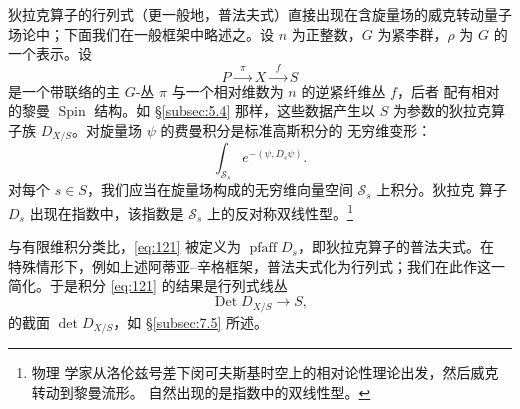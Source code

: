 \documentclass[11pt]{amsart}
\theoremstyle{definition}
\theoremstyle{remark}
\theoremstyle{plain}
\numberwithin{equation}{section}
\renewcommand{\:}{\colon}
\DeclareMathOperator{\Ker}{Ker}
\DeclareMathOperator{\Spin}{Spin}
\DeclareMathOperator{\Det}{Det}
\DeclareMathOperator{\pfaff}{pfaff}
\newcommand{\sS}{\mathscr{S}}
\begin{document}

狄拉克算子的行列式（更一般地，普法夫式）直接出现在含旋量场的威克转动量子
场论中；下面我们在一般框架中略述之。设 $n$ 为正整数，$G$ 为紧李群，$\rho $
为 $G$ 的一个表示。设
  \begin{equation}\label{eq:120}
     P\xrightarrow{\;\;\pi \;\;}X\xrightarrow{\;\;f\;\;}S 
  \end{equation}
是一个带联络的主 $G$-丛 $\pi $ 与一个相对维数为 $n$ 的逆紧纤维丛 $f$，后者
配有相对的黎曼 $\Spin$ 结构。如 §\ref{subsec:5.4} 那样，这些数据产生以 $S$
为参数的狄拉克算子族 $D_{X/S}$。对旋量场 $\psi $ 的费曼积分是标准高斯积分的
无穷维变形：
  \begin{equation}\label{eq:121}
     \int_{\sS_s} e^{-(\psi ,D_s\psi )}. 
  \end{equation}
对每个 $s\in S$，我们应当在旋量场构成的无穷维向量空间 $\sS_s$ 上积分。狄拉克
算子 $D_s$ 出现在指数中，该指数是 $\sS_s$ 上的反对称双线性型。\footnote{物理
学家从洛伦兹号差下闵可夫斯基时空上的相对论性理论出发，然后威克转动到黎曼流形。
自然出现的是指数中的双线性型。}



与有限维积分类比，\eqref{eq:121} 被定义为 $\pfaff D_s$，即狄拉克算子的普法夫式。在
特殊情形下，例如上述阿蒂亚–辛格框架，普法夫式化为行列式；我们在此作这一
简化。于是积分 \eqref{eq:121} 的结果是行列式线丛
  \begin{equation}\label{eq:122}
     \Det D_{X/S}\longrightarrow S, 
  \end{equation}
的截面 $\det D_{X/S}$，如 §\ref{subsec:7.5} 所述。
\end{document}
